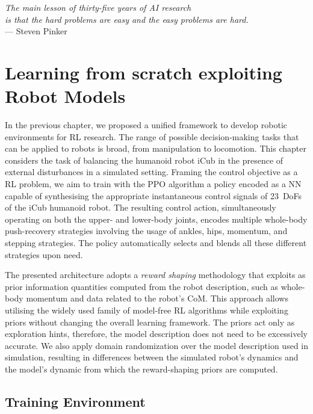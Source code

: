 \begin{flushright}
    \textsl{\onehalfspacing
    The main lesson of thirty-five years of AI research\\
    is that the hard problems are easy and the easy problems are hard.}\\
    --- Steven Pinker
\end{flushright}

\chapter{Learning from scratch exploiting Robot Models}
\label{ch:learning_from_scratch}

In the previous chapter, we proposed a unified framework to develop robotic environments for \ac{RL} research.
The range of possible decision-making tasks that can be applied to robots is broad, from manipulation to locomotion.
This chapter considers the task of balancing the humanoid robot iCub in the presence of external disturbances in a simulated setting.
Framing the control objective as a \ac{RL} problem, we aim to train with the \ac{PPO} algorithm a policy encoded as a \ac{NN} capable of synthesising the appropriate instantaneous control signals of 23~\acp{DoF} of the iCub humanoid robot.
The resulting control action, simultaneously operating on both the upper- and lower-body joints, encodes multiple whole-body push-recovery strategies involving the usage of ankles, hips, momentum, and stepping strategies.
The policy automatically selects and blends all these different strategies upon need.

The presented architecture adopts a \emph{reward shaping} methodology that exploits as prior information quantities computed from the robot description, such as whole-body momentum and data related to the robot's \ac{CoM}.
This approach allows utilising the widely used family of model-free \ac{RL} algorithms while exploiting priors without changing the overall learning framework.
The priors act only as exploration hints, therefore, the model description does not need to be excessively accurate.
We also apply domain randomization over the model description used in simulation, resulting in differences between the simulated robot's dynamics and the model's dynamic from which the reward-shaping priors are computed.

\newpage
\section{Training Environment}

